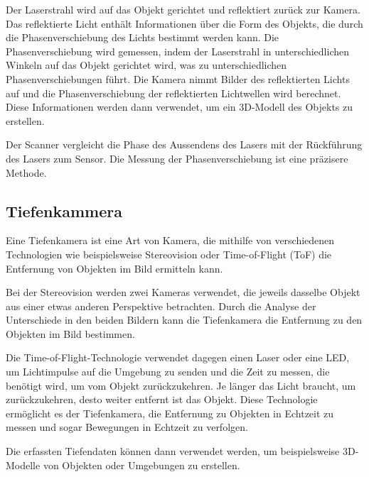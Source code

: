 Der Laserstrahl wird auf das Objekt gerichtet und reflektiert zurück zur Kamera. Das reflektierte Licht enthält Informationen über die Form des Objekts, die durch die Phasenverschiebung des Lichts bestimmt werden kann. Die Phasenverschiebung wird gemessen, indem der Laserstrahl in unterschiedlichen Winkeln auf das Objekt gerichtet wird, was zu unterschiedlichen Phasenverschiebungen führt. Die Kamera nimmt Bilder des reflektierten Lichts auf und die Phasenverschiebung der reflektierten Lichtwellen wird berechnet. Diese Informationen werden dann verwendet, um ein 3D-Modell des Objekts zu erstellen.

Der Scanner vergleicht die Phase des Aussendens des Lasers mit der Rückführung des Lasers zum Sensor. Die Messung der Phasenverschiebung ist eine präzisere Methode.

\subsection{Tiefenkammera}
Eine Tiefenkamera ist eine Art von Kamera, die mithilfe von verschiedenen Technologien wie beispielsweise Stereovision oder Time-of-Flight (ToF) die Entfernung von Objekten im Bild ermitteln kann.

Bei der Stereovision werden zwei Kameras verwendet, die jeweils dasselbe Objekt aus einer etwas anderen Perspektive betrachten. Durch die Analyse der Unterschiede in den beiden Bildern kann die Tiefenkamera die Entfernung zu den Objekten im Bild bestimmen.

Die Time-of-Flight-Technologie verwendet dagegen einen Laser oder eine LED, um Lichtimpulse auf die Umgebung zu senden und die Zeit zu messen, die benötigt wird, um vom Objekt zurückzukehren. Je länger das Licht braucht, um zurückzukehren, desto weiter entfernt ist das Objekt. Diese Technologie ermöglicht es der Tiefenkamera, die Entfernung zu Objekten in Echtzeit zu messen und sogar Bewegungen in Echtzeit zu verfolgen.

Die erfassten Tiefendaten können dann verwendet werden, um beispielsweise 3D-Modelle von Objekten oder Umgebungen zu erstellen. \cite[vgl.][]{TiefenKamera}


